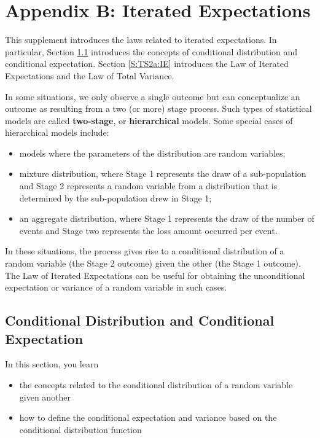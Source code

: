 \documentclass[]{book}
\providecommand{\tightlist}{%
  \setlength{\itemsep}{0pt}\setlength{\parskip}{0pt}}
\theoremstyle{definition}
\theoremstyle{definition}
\theoremstyle{definition}
\theoremstyle{remark}
\begin{document}
\chapter{Appendix B: Iterated Expectations}\label{C:TS2a}

This supplement introduces the laws related to iterated expectations. In
particular, Section \ref{S:TS2a:CD} introduces the concepts of
conditional distribution and conditional expectation. Section
\ref{S:TS2a:IE} introduces the Law of Iterated Expectations and the Law
of Total Variance.

In some situations, we only observe a single outcome but can
conceptualize an outcome as resulting from a two (or more) stage
process. Such types of statistical models are called \textbf{two-stage},
or \textbf{hierarchical} models. Some special cases of hierarchical
models include:

\begin{itemize}
\item
  models where the parameters of the distribution are random variables;
\item
  mixture distribution, where Stage 1 represents the draw of a
  sub-population and Stage 2 represents a random variable from a
  distribution that is determined by the sub-population drew in Stage 1;
\item
  an aggregate distribution, where Stage 1 represents the draw of the
  number of events and Stage two represents the loss amount occurred per
  event.
\end{itemize}

In these situations, the process gives rise to a conditional
distribution of a random variable (the Stage 2 outcome) given the other
(the Stage 1 outcome). The Law of Iterated Expectations can be useful
for obtaining the unconditional expectation or variance of a random
variable in such cases.

\section{Conditional Distribution and Conditional
Expectation}\label{S:TS2a:CD}

In this section, you learn

\begin{itemize}
\tightlist
\item
  the concepts related to the conditional distribution of a random
  variable given another
\item
  how to define the conditional expectation and variance based on the
  conditional distribution function
\end{itemize}
\end{document}
